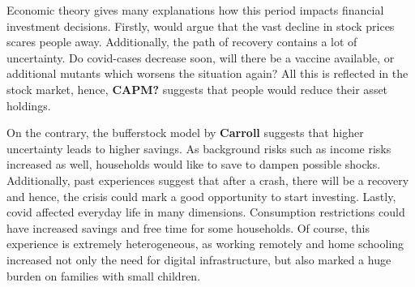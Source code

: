\documentclass[ProjectABM]{subfiles}
\begin{document}


Economic theory gives many explanations how this period impacts financial investment decisions. Firstly, \cite{malmendier_2011} would argue that the vast decline in stock prices scares people away. Additionally, the path of recovery contains a lot of uncertainty. Do covid-cases decrease soon, will there be a vaccine available, or additional mutants which worsens the situation again? All this is reflected in the stock market, hence, \textbf{CAPM?} suggests that people would reduce their asset holdings.

On the contrary, the bufferstock model by \textbf{Carroll} suggests that higher uncertainty leads to higher savings. As background risks such as income risks increased as well, households would like to save to dampen possible shocks. %
Additionally, past experiences suggest that after a crash, there will be a recovery and hence, the crisis could mark a good opportunity to start investing. Lastly, covid affected everyday life in many dimensions. Consumption restrictions could have increased savings and free time for some households. Of course, this experience is extremely heterogeneous, as working remotely and home schooling increased not only the need for digital infrastructure, but also marked a huge burden on families with small children.


\end{document}
